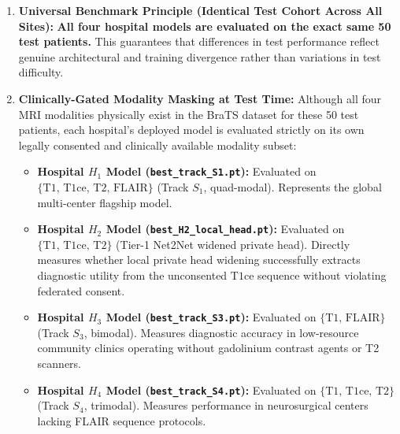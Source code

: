\documentclass[10pt,a4paper]{article}
\begin{document}
\begin{enumerate}[itemsep=2pt, topsep=2pt]
    \item \textbf{Universal Benchmark Principle (Identical Test Cohort Across All Sites):}
    \textbf{All four hospital models are evaluated on the exact same 50 test patients.} This guarantees that differences in test performance reflect genuine architectural and training divergence rather than variations in test difficulty.

    \item \textbf{Clinically-Gated Modality Masking at Test Time:}
    Although all four MRI modalities physically exist in the BraTS dataset for these 50 test patients, each hospital's deployed model is evaluated strictly on its own legally consented and clinically available modality subset:
    \begin{itemize}[itemsep=1.5pt, topsep=1.5pt]
        \item \textbf{Hospital $H_1$ Model (\texttt{best\_track\_S1.pt}):} Evaluated on $\{\text{T1, T1ce, T2, FLAIR}\}$ (Track $S_1$, quad-modal). Represents the global multi-center flagship model.
        \item \textbf{Hospital $H_2$ Model (\texttt{best\_H2\_local\_head.pt}):} Evaluated on $\{\text{T1, T1ce, T2}\}$ (Tier-1 Net2Net widened private head). Directly measures whether local private head widening successfully extracts diagnostic utility from the unconsented $\text{T1ce}$ sequence without violating federated consent.
        \item \textbf{Hospital $H_3$ Model (\texttt{best\_track\_S3.pt}):} Evaluated on $\{\text{T1, FLAIR}\}$ (Track $S_3$, bimodal). Measures diagnostic accuracy in low-resource community clinics operating without gadolinium contrast agents or T2 scanners.
        \item \textbf{Hospital $H_4$ Model (\texttt{best\_track\_S4.pt}):} Evaluated on $\{\text{T1, T1ce, T2}\}$ (Track $S_4$, trimodal). Measures performance in neurosurgical centers lacking FLAIR sequence protocols.
    \end{itemize}


\end{enumerate}
\end{document}
